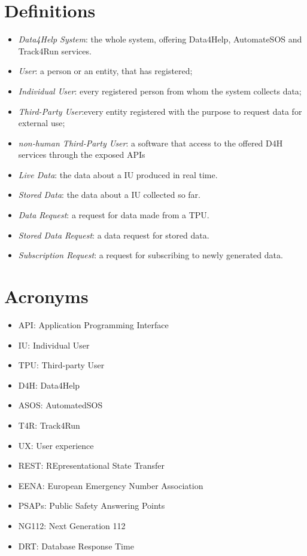 \section{Definitions}
\begin{itemize}
\item \textit{Data4Help System}: the whole system, offering Data4Help, AutomateSOS and Track4Run services.
\item \textit{User}: a person or an entity, that has registered;
\item \textit{Individual User}: every registered person from whom the system collects data; 
\item \textit{Third-Party User}:every entity registered with the purpose to request data for external use;
\item \textit{non-human Third-Party User}: a software that access to the offered D4H services through the exposed APIs
\item \textit{Live Data}: the data about a IU produced in real time.
\item \textit{Stored Data}: the data about a IU collected so far.
\item \textit{Data Request}: a request for data made from a TPU.
\item \textit{Stored Data Request}: a data request for stored data.
\item \textit{Subscription Request}: a request for subscribing to newly generated data.
\end{itemize}
\section{Acronyms}
\begin{itemize}
\item API: Application Programming Interface
\item IU: Individual User
\item TPU: Third-party User
\item	D4H: Data4Help
\item	ASOS: AutomatedSOS
\item T4R: Track4Run
\item UX: User experience
\item REST: REpresentational State Transfer
\item EENA: European Emergency Number Association
\item PSAPs: Public Safety Answering Points
\item NG112: Next Generation 112
\item DRT: Database Response Time
\end{itemize}

